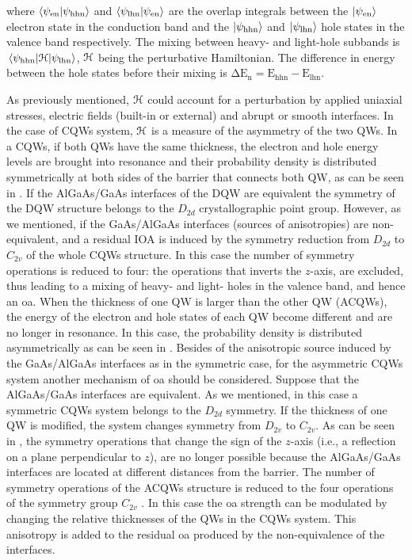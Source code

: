 where $\braket{\psi_{\mathrm{en}}}{\psi_{\mathrm{hhn}}}$  and $\braket{\psi_{\mathrm{lhn}}}{\psi_{\mathrm{en}}}$ are the overlap integrals between the  $\ket{\psi_{\mathrm{en}}}$  electron state in the conduction band and the $\ket{\psi_{\mathrm{hhn}}}$  and  $\ket{\psi_{\mathrm{lhn}}}$   hole states in the valence band respectively. The  mixing between heavy- and light-hole subbands is $\mel{\psi_{\mathrm{hhn}}}{\cal{H}}{\psi_{\mathrm{lhn}}}$, $\cal{H}$  being the  perturbative Hamiltonian. The difference in energy between the hole states before their mixing is $\mathrm{\Delta E_{n} = E_{hhn} - E_{lhn}}$.

As previously mentioned,  $\cal{H}$ could account  for a perturbation  by applied uniaxial stresses, electric fields (built-in or external) and  abrupt or smooth interfaces.
In the case of \gls{CQWs} system, $\cal{H}$ is a  measure of the  asymmetry of the two \gls{QW}s. 
In a \gls{CQWs}, if both QWs have the same thickness, the electron and hole energy levels are brought
into resonance and their probability density is distributed symmetrically at both sides of the barrier that connects both \gls{QW}, as can be seen in . If the AlGaAs/GaAs interfaces of the DQW are equivalent the symmetry of the DQW structure belongs to the $D_{2d}$ crystallographic point group. However, as we mentioned, if the GaAs/AlGaAs interfaces (sources of anisotropies) are non-equivalent, and a residual IOA is induced by the symmetry reduction from $D_{2d}$ to $C_{2v}$ of the whole \gls{CQWs} structure. In this case the number of symmetry operations is reduced to four: the operations that inverts the  $z$-axis, are excluded, thus leading to a mixing of heavy- and light- holes in the valence band, and hence an \gls{oa}.
When the thickness of one \gls{QW} is larger than the other \gls{QW} (\gls{ACQWs}), the energy of the electron and hole states of each \gls{QW} become different and are no longer in resonance. In this case, the probability density is distributed asymmetrically as can be seen in . Besides of the anisotropic source induced by the GaAs/AlGaAs interfaces as in the symmetric case, for the asymmetric \gls{CQWs}  system another mechanism of \gls{oa} should be considered. Suppose that the AlGaAs/GaAs interfaces are equivalent. As we mentioned, in this case a symmetric \gls{CQWs} system belongs to the $D_{2d}$ symmetry. If the thickness of one \gls{QW} is modified, the system changes symmetry from $D_{2v}$ to $C_{2v}$. As can be seen in , the symmetry operations
that change the sign of the $z$-axis (i.e., a reflection on a
plane perpendicular to $z$), are no longer possible because
the AlGaAs/GaAs interfaces are located at different distances
from the barrier. The number of symmetry operations
of the \gls{ACQWs} structure is reduced to
the four operations of the symmetry group $C_{2v}$ \cite{ivchenko2008spinphoto,glazov2018electron}. In this case the \gls{oa} strength can be modulated by changing
the relative thicknesses of the \gls{QW}s in the \gls{CQWs} system. This anisotropy is added to the residual \gls{oa} produced by the non-equivalence of the interfaces.

